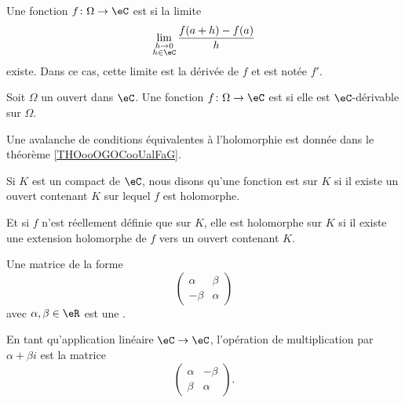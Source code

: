 \begin{definition}      \label{DEFooVJVXooKlnFkh}
    Une fonction \( f\colon \Omega\to \eC\) est  si la limite
    \begin{equation}
        \lim_{\substack{h\to0\\h\in \eC}} \frac{ f(a+h)-f(a) }{ h }
    \end{equation}
    existe. Dans ce cas, cette limite est la dérivée de \( f\) et est notée \( f'\).
\end{definition}

\begin{definition}  \label{DefMMpjJZ}
    Soit \( \Omega\) un ouvert dans \( \eC\). Une fonction \( f\colon \Omega\to \eC\) est  si elle est \( \eC\)-dérivable sur \( \Omega\).
\end{definition}

Une avalanche de conditions équivalentes à l'holomorphie est donnée dans le théorème \ref{THOooOGOCooUalFaG}.

\begin{definition}      \label{DEFooQSMCooOoWVZk}
    Si \( K\) est un compact de \( \eC\), nous disons qu'une fonction est  sur \( K\) si il existe un ouvert contenant \( K\) sur lequel \( f\) est holomorphe.

    Et si \( f\) n'est réellement définie que sur \( K\), elle est holomorphe sur \( K\) si il existe une extension holomorphe de \( f\) vers un ouvert contenant \( K\).
\end{definition}

\begin{definition}
    Une matrice de la forme
    \begin{equation}
        \begin{pmatrix}
            \alpha    &   \beta    \\
            -\beta    &   \alpha
        \end{pmatrix}
    \end{equation}
    avec \( \alpha,\beta\in \eR\) est une .
\end{definition}

\begin{lemma}       \label{LEMooJNFEooZCbJMo}
    En tant qu'application linéaire \( \eC\to \eC\), l'opération de multiplication par \( \alpha+\beta i\) est la matrice
    \begin{equation}
        \begin{pmatrix}
            \alpha    &   -\beta    \\
            \beta    &   \alpha
        \end{pmatrix}.
    \end{equation}
\end{lemma}

